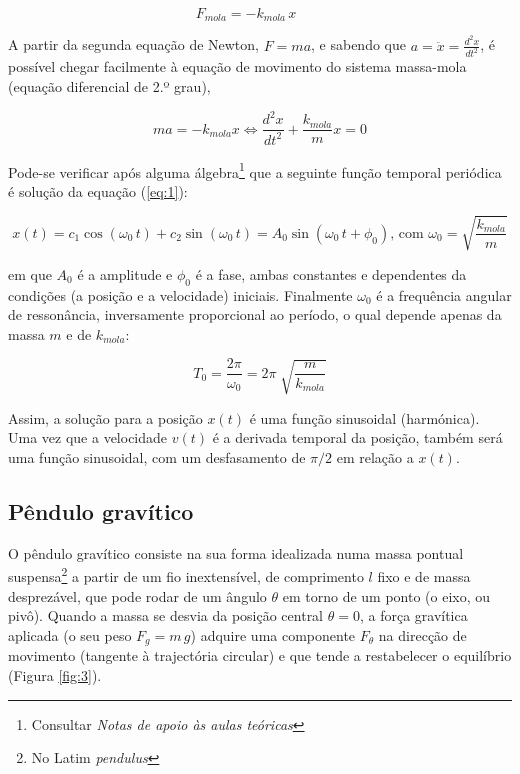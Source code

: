 \documentclass[a4paper,twoside,12pt]{article}      %
\begin{document}
\begin{equation}
F_{mola} = - k_{mola} \, x \qquad 
\end{equation}

A partir da segunda equação de Newton, $F=m a$, e sabendo que $ a = \ddot{x}= \frac{d^2 x}{dt^2}$, é possível chegar facilmente  à equação de movimento do sistema massa-mola (equação diferencial de 2.º grau),

\begin{equation}
	\label{eq:1} 
 m a = - k_{mola} x \Leftrightarrow \frac{d^2 x}{dt^2}  + \frac{k_{mola}}{m} x = 0
\end{equation}

Pode-se verificar após alguma álgebra\footnote{Consultar \emph{Notas de apoio às aulas teóricas}} que a seguinte função temporal periódica é solução da equação (\ref{eq:1}):

\begin{equation}
	\label{eq:solu_mola}
x(t) = c_1 \cos(\omega_0 \, t) + c_2 \sin(\omega_0 \, t) = A_0 \sin(\omega_0 \, t + \phi_0) \text{, com } \omega_0 = \sqrt{\frac{k_{mola}}{m}}
\end{equation}

em que $ A_0 $ é a amplitude e $\phi_0$ é a fase, ambas constantes e dependentes da condições (a posição e a velocidade) iniciais. Finalmente $\omega_0$ é a frequência angular de ressonância, inversamente proporcional ao período, o qual depende apenas da massa $m$ e de $k_{mola}$:

\begin{equation}
	\label{eq:period_mola}
T_0 = \frac{2 \pi}{\omega_0} = 2\pi\; \sqrt{\frac{m}{k_{mola}}}
\end{equation}

Assim, a solução para a posição $x(t)$ é uma função sinusoidal (harmónica). Uma vez que a velocidade $v(t)$ é a derivada temporal da posição, também será uma função sinusoidal, com um desfasamento de $\pi/2$ em relação a $x(t)$.



\subsection{\sf Pêndulo gravítico}
O pêndulo gravítico consiste na sua forma idealizada numa massa pontual suspensa\footnote{No Latim \emph{pendulus}} a partir de um fio inextensível, de comprimento $l$ fixo e de massa desprezável, que pode rodar de um ângulo $\theta$ em torno de um ponto (o eixo, ou pivô). Quando a massa se desvia da posição central $\theta=0$, a força gravítica aplicada (o seu peso $F_g = m \, g $) adquire uma componente $F_{\theta}$ na direcção de movimento (tangente à trajectória circular) e que tende a restabelecer o equilíbrio (Figura \ref{fig:3}).
\end{document}
